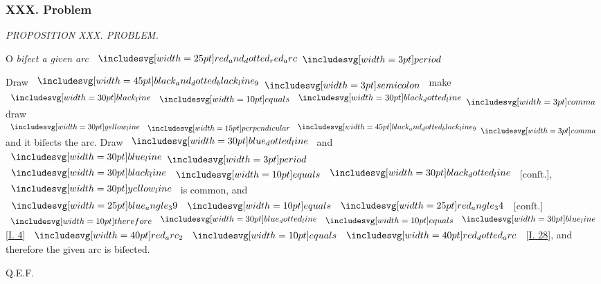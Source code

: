 \documentclass[11pt,preview]{standalone}
\begin{document}
\subsubsection{XXX. Problem}

\begin{minipage}[t]{0.54\textwidth}
    \begin{center}
        \textit{PROPOSITION XXX. PROBLEM.}\label{book3pr30} \\
    \end{center}

    \hfill

    \begin{center}
        \raggedright \lettrine[lines=3, loversize=1, nindent=0pt]{}{}O \textit{biſect a given arc} $\img{red_and_dotted_red_arc} \bperiod$
    \end{center}
\end{minipage}%
\hfill
\begin{minipage}[t]{0.43\textwidth}
    \vspace{20pt}
    
\end{minipage}%

\hfill

\hfill

\begin{center}
    Draw $\bimg{black_and_dotted_black_line_9} \bsemicolon$ make $\blackline \bequals \dottedblackline \bcomma$ draw $\yellowline \bperp \bimg{black_and_dotted_black_line_9} \bcomma$  and it biſects the arc. Draw $\dottedblueline$ and $\blueline \bperiod$ $\blackline \bequals \dottedblackline$ [conſt.], $\yellowline$ is common, and $\img{blue_angle_39} \bequals \img{red_angle_34}$ [conſt.] $\btherefore \dottedblueline \bequals \blueline$ [\hyperref[book1pr4]{\textsc{I.} 4}] $\img[0][0][40]{red_arc_2} \bequals \img[0][0][40]{red_dotted_arc}$ [\hyperref[book3pr28]{\textsc{I.} 28}], and therefore the given arc is biſected.
\end{center}

\hfill

\hfill Q.E.F.
\end{document}

